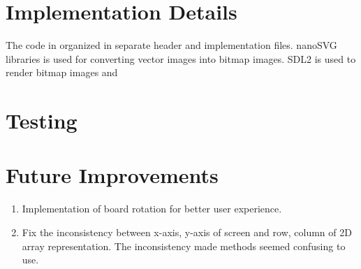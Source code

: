 \documentclass[a4paper, 10pt, titlepage]{article}
\begin{document}
\section{Implementation Details}
The code in organized in separate header and implementation files. nanoSVG libraries is used for converting vector images into bitmap images. SDL2 is used to render bitmap images and 
\section{Testing}
\section{Future Improvements}
\begin{enumerate}
    \item Implementation of board rotation for better user experience.
    \item Fix the inconsistency between x-axis, y-axis of screen and row, column of 2D array representation. The inconsistency made methods seemed confusing to use. 
\end{enumerate}
\end{document}
